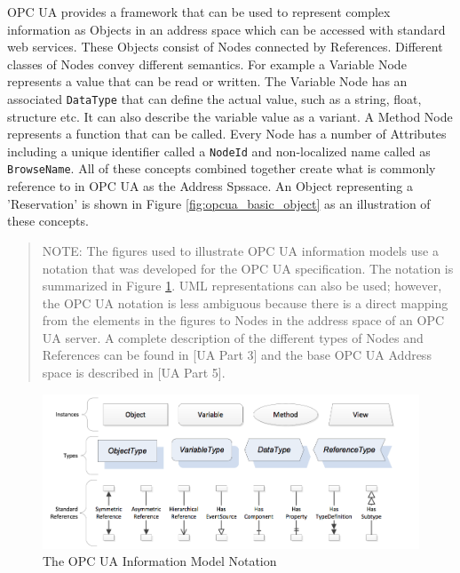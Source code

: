 OPC UA provides a framework that can be used to represent complex information as Objects in an address space which can be accessed with standard web services. These Objects consist of Nodes connected by References. Different classes of Nodes convey different semantics. For example a Variable Node represents a value that can be read or written. The Variable Node has an associated \texttt{DataType} that can define the actual value, such as a string, float, structure etc. It can also describe the variable value as a variant. A Method Node represents a function that can be called. Every Node has a number of Attributes including a unique identifier called a \texttt{NodeId} and non-localized name called as \texttt{BrowseName}. All of these concepts combined together create what is commonly reference to in OPC UA as the Address Spssace. An Object representing a 'Reservation' is shown in Figure \ref{fig:opcua_basic_object} as an illustration of these concepts.

\begin{quote}
\footnotesize
NOTE: The figures used to illustrate OPC UA information models use a notation that was developed for the OPC UA specification. The notation is summarized in Figure \ref{fig:opc_ua_notation}. UML representations can also be used; however, the OPC UA notation is less ambiguous because there is a direct mapping from the elements in the figures to Nodes in the address space of an OPC UA server. A complete description of the different types of Nodes and References can be found in [UA Part 3] and the base OPC UA Address space is described in [UA Part 5].
\end{quote}

\begin{figure}[h]
  \centering
  \includegraphics[width=1.0\textwidth]{diagrams/OpcInfoModelNotation.png}
  \caption{The OPC UA Information Model Notation}
  \label{fig:opc_ua_notation}
\end{figure}

